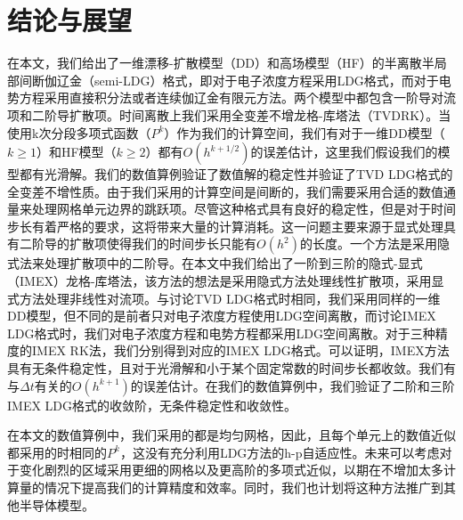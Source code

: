 \section{结论与展望}
在本文，我们给出了一维漂移-扩散模型（DD）和高场模型（HF）的半离散半局部间断伽辽金（semi-LDG）格式，即对于电子浓度方程采用LDG格式，而对于电势方程采用直接积分法或者连续伽辽金有限元方法。两个模型中都包含一阶导对流项和二阶导扩散项。时间离散上我们采用全变差不增龙格-库塔法（TVDRK）。当使用k次分段多项式函数（$P^k$）作为我们的计算空间，我们有对于一维DD模型（$k\geq 1$）和HF模型（$k\geq 2$）都有$O(h^{k+1/2})$的误差估计\cite{liu2010error}，这里我们假设我们的模型都有光滑解。我们的数值算例验证了数值解的稳定性并验证了TVD LDG格式的全变差不增性质。由于我们采用的计算空间是间断的，我们需要采用合适的数值通量来处理网格单元边界的跳跃项。尽管这种格式具有良好的稳定性，但是对于时间步长有着严格的要求，这将带来大量的计算消耗。这一问题主要来源于显式处理具有二阶导的扩散项使得我们的时间步长只能有$O(h^2)$的长度。一个方法是采用隐式法来处理扩散项中的二阶导。在本文中我们给出了一阶到三阶的隐式-显式（IMEX）龙格-库塔法，该方法的想法是采用隐式方法处理线性扩散项，采用显式方法处理非线性对流项。与讨论TVD LDG格式时相同，我们采用同样的一维DD模型，但不同的是前者只对电子浓度方程使用LDG空间离散，而讨论IMEX LDG格式时，我们对电子浓度方程和电势方程都采用LDG空间离散。对于三种精度的IMEX RK法，我们分别得到对应的IMEX LDG格式。可以证明，IMEX方法具有无条件稳定性，且对于光滑解和小于某个固定常数的时间步长都收敛。我们有与$\Delta t$有关的$O(h^{k+1})$的误差估计\cite{liu2016analysis}。在我们的数值算例中，我们验证了二阶和三阶IMEX LDG格式的收敛阶，无条件稳定性和收敛性。

在本文的数值算例中，我们采用的都是均匀网格，因此，且每个单元上的数值近似都采用的时相同的$P^k$，这没有充分利用LDG方法的h-p自适应性。未来可以考虑对于变化剧烈的区域采用更细的网格以及更高阶的多项式近似，以期在不增加太多计算量的情况下提高我们的计算精度和效率。同时，我们也计划将这种方法推广到其他半导体模型。
